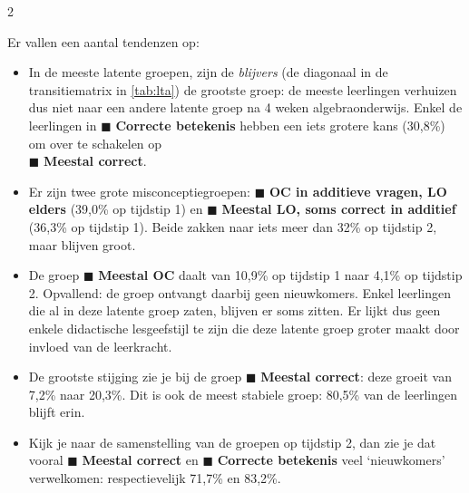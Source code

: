 \begin{multicols}{2}
\begin{figure}
\end{figure}
Er vallen een aantal tendenzen op:
\begin{itemize}
    \item In de meeste latente groepen, zijn de \textit{blijvers} (de diagonaal in de transitiematrix in \autoref{tab:lta}) de grootste groep: de meeste leerlingen verhuizen dus niet naar een andere latente groep na 4 weken algebraonderwijs. Enkel de leerlingen in \textcolor{kleurcorrectbetekenis}{$\blacksquare$} \textbf{Correcte betekenis} hebben een iets grotere kans (30,8\%) om over te schakelen op \\\textcolor{kleurmeestalcorrect}{$\blacksquare$} \textbf{Meestal correct}.
    \item Er zijn twee grote misconceptiegroepen: \textcolor{kleurOCaddLOelders}{$\blacksquare$} \textbf{OC in additieve vragen, LO elders} (39,0\% op tijdstip 1) en \textcolor{kleurmeestalLO}{$\blacksquare$} \textbf{Meestal LO, soms correct in additief} (36,3\% op tijdstip 1). Beide zakken naar iets meer dan 32\% op tijdstip 2, maar blijven groot. 
    \item De groep \textcolor{kleurmeestalOC}{$\blacksquare$} \textbf{Meestal OC} daalt van 10,9\% op tijdstip 1 naar 4,1\% op tijdstip 2. Opvallend: de groep ontvangt daarbij geen nieuwkomers. Enkel leerlingen die al in deze latente groep zaten, blijven er soms zitten. Er lijkt dus geen enkele didactische lesgeefstijl te zijn die deze latente groep groter maakt door invloed van de leerkracht.
    \item De grootste stijging zie je bij de groep \textcolor{kleurmeestalcorrect}{$\blacksquare$}{ \textbf{Meestal correct}}: deze groeit van 7,2\% naar 20,3\%. Dit is ook de meest stabiele groep: 80,5\% van de leerlingen blijft erin. 
    \item Kijk je naar de samenstelling van de groepen op tijdstip 2, dan zie je dat vooral \textcolor{kleurmeestalcorrect}{$\blacksquare$} \textbf{Meestal correct} en \textcolor{kleurcorrectbetekenis}{$\blacksquare$} \textbf{Correcte betekenis} veel `nieuwkomers' verwelkomen: respectievelijk 71,7\% en 83,2\%.
\end{itemize}

\end{multicols}
